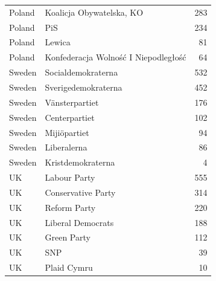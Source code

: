 \begin{table}
\begin{tabular}[t]{llr}
Poland & Koalicja Obywatelska, KO & 283\\
Poland & PiS & 234\\
Poland & Lewica & 81\\
Poland & Konfederacja Wolność I Niepodległość & 64\\
Sweden & Socialdemokraterna & 532\\
Sweden & Sverigedemokraterna & 452\\
Sweden & Vänsterpartiet & 176\\
Sweden & Centerpartiet & 102\\
Sweden & Mijiöpartiet & 94\\
Sweden & Liberalerna & 86\\
Sweden & Kristdemokraterna & 4\\
UK & Labour Party & 555\\
UK & Conservative Party & 314\\
UK & Reform Party & 220\\
UK & Liberal Democrats & 188\\
UK & Green Party & 112\\
UK & SNP & 39\\
UK & Plaid Cymru & 10\\
\bottomrule
\end{tabular}
\end{table}
